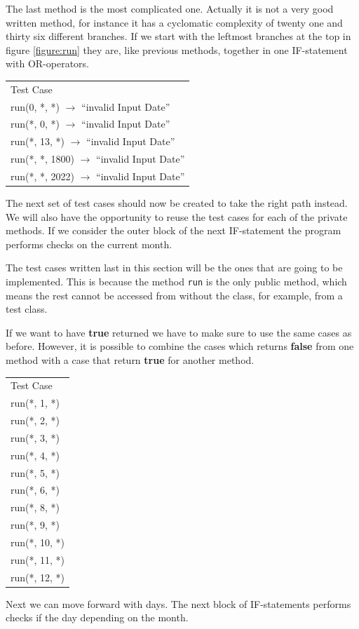 \documentclass[a4paper]{article}
\begin{document}
The last method is the most complicated one. Actually it is not a very good written method, for instance it has a cyclomatic complexity of twenty one and thirty six different branches. If we start with the leftmost branches at the top in figure \ref{figure:run} they are, like previous methods, together in one IF-statement with OR-operators.

\begin{table}[h]
	\begin{tabular}{l}
		Test Case\\
		run(0, *, *) $\rightarrow$ ``invalid Input Date''\\
		run(*, 0, *) $\rightarrow$ ``invalid Input Date''\\
		run(*, 13, *) $\rightarrow$ ``invalid Input Date''\\
		run(*, *, 1800) $\rightarrow$ ``invalid Input Date''\\		
		run(*, *, 2022) $\rightarrow$ ``invalid Input Date''\\
	\end{tabular}
\end{table}

The next set of test cases should now be created to take the right path instead. We will also have the opportunity to reuse the test cases for each of the private methods. If we consider the outer block of the next IF-statement the program performs checks on the current month. 

The test cases written last in this section will be the ones that are going to be implemented. This is because the method \texttt{run} is the only public method, which means the rest cannot be accessed from without the class, for example, from a test class.

If we want to have \textbf{true} returned we have to make sure to use the same cases as before. However, it is possible to combine the cases which returns \textbf{false} from one method with a case that return \textbf{true} for another method. 

\begin{table}[h]
	\begin{tabular}{l}
		Test Case\\
		run(*, 1, *)\\
		run(*, 2, *)\\
		run(*, 3, *)\\
		run(*, 4, *)\\
		run(*, 5, *)\\
		run(*, 6, *)\\
		run(*, 8, *)\\
		run(*, 9, *)\\
		run(*, 10, *)\\
		run(*, 11, *)\\
		run(*, 12, *)\\
	\end{tabular}
\end{table}

Next we can move forward with days. The next block of IF-statements performs checks if the day depending on the month.
\end{document}
